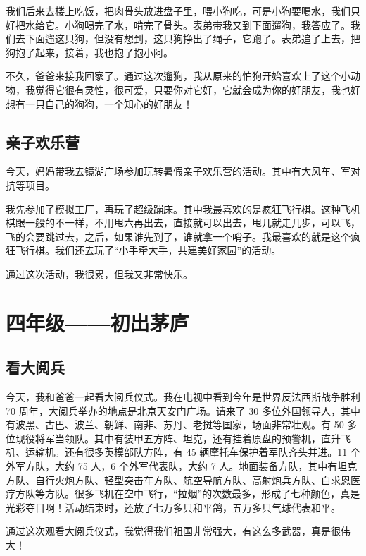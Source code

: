 \documentclass[UTF8,a4paper,titlepage,twoside,10.5pt]{article}
\begin{document}
我们后来去楼上吃饭，把肉骨头放进盘子里，喂小狗吃，可是小狗要喝水，我们只好把水给它。小狗喝完了水，啃完了骨头。表弟带我又到下面遛狗，我答应了。我们去下面遛这只狗，但没有想到，这只狗挣出了绳子，它跑了。表弟追了上去，把狗抱了起来，接着，我也抱了抱小阿。

不久，爸爸来接我回家了。通过这次遛狗，我从原来的怕狗开始喜欢上了这个小动物，我觉得它很有灵性，很可爱，只要你对它好，它就会成为你的好朋友，我也好想有一只自己的狗狗，一个知心的好朋友！

\subsection{亲子欢乐营}
\label{sec:orgbbfd812}

今天，妈妈带我去镜湖广场参加玩转暑假亲子欢乐营的活动。其中有大风车、军对抗等项目。

我先参加了模拟工厂，再玩了超级蹦床。其中我最喜欢的是疯狂飞行棋。这种飞机棋跟一般的不一样，不用甩六再出去，直接就可以出去，甩几就走几步，可以飞，飞的会要跳过去，之后，如果谁先到了，谁就拿一个哨子。我最喜欢的就是这个疯狂飞行棋。我们还去玩了“小手牵大手，共建美好家园”的活动。

通过这次活动，我很累，但我又非常快乐。

\newpage

\section{四年级——初出茅庐}
\label{sec:org836feba}

\subsection{看大阅兵}
\label{sec:org6bd9b20}

今天，我和爸爸一起看大阅兵仪式。我在电视中看到今年是世界反法西斯战争胜利 70 周年，大阅兵举办的地点是北京天安门广场。请来了 30 多位外国领导人，其中有波黑、古巴、波兰、朝鲜、南非、苏丹、老挝等国家，场面非常壮观。有 50 多位现役将军当领队。其中有装甲五方阵、坦克，还有挂着原盘的预警机，直升飞机、运输机。还有很多英模部队方阵，有 45 辆摩托车保护着军队齐头并进。11 个外军方队，大约 75 人，6 个外军代表队，大约 7 人。地面装备方队，其中有坦克方队、自行火炮方队、轻型突击车方队、航空导航方队、高射炮兵方队、白求恩医疗方队等方队。很多飞机在空中飞行，“拉烟”的次数最多，形成了七种颜色，真是光彩夺目啊！活动结束时，还放了七万多只和平鸽，五万多只气球代表和平。

通过这次观看大阅兵仪式，我觉得我们祖国非常强大，有这么多武器，真是很伟大！
\end{document}
